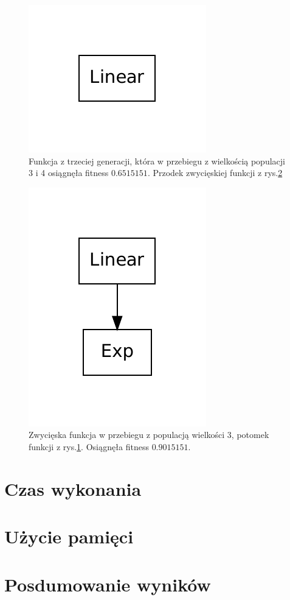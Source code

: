    	\begin{figure}
		\includegraphics[scale=0.60]{figures/functions/func3}
		\caption{Funkcja z trzeciej generacji, która w przebiegu z wielkością populacji 3 i 4 osiągnęła fitness $0.6515151$. Przodek zwycięskiej funkcji z rys.\ref{fig:func4}\label{fig:func3}}
	\end{figure}                 

    	\begin{figure}
		\includegraphics[scale=0.60]{figures/functions/func4}
		\caption{Zwycięska funkcja w przebiegu z populacją wielkości 3, potomek funkcji z rys.\ref{fig:func3}. Osiągnęła fitness $0.9015151$. \label{fig:func4}}
	\end{figure} 


		


\section{Czas wykonania}

\section{Użycie pamięci}

\section{Posdumowanie wyników}

\clearpage
